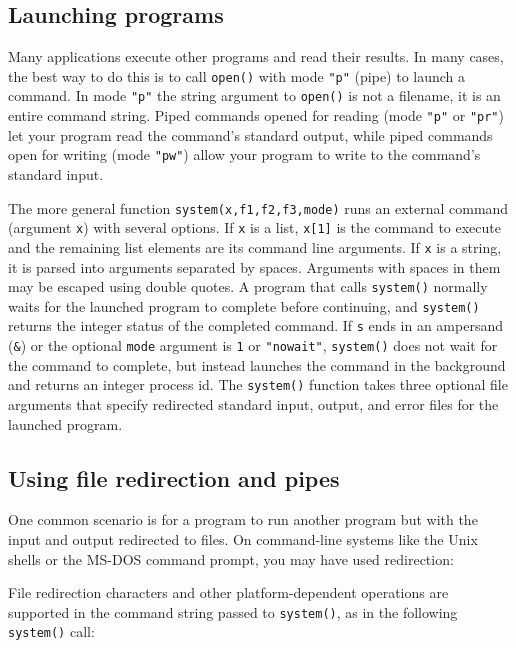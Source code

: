 \subsection{Launching programs}

Many applications execute other programs and read their results. In many cases,
the best way to do this is to call \texttt{open()} with mode \texttt{"p"}
(pipe) to launch a command. In mode \texttt{"p"} the string argument
to \texttt{open()} is not a filename, it is an entire command string. Piped
commands opened for reading (mode \texttt{"p"} or \texttt{"pr"}) let your
program read the command's standard output, while piped commands open for
writing (mode \texttt{"pw"}) allow your program to write to the command's
standard input.

The more general function \texttt{system(x,f1,f2,f3,mode)} runs an external
command (argument \texttt{x}) with several options. If \texttt{x} is a list,
\texttt{x[1]} is the command to execute and the remaining list elements are its
command line arguments. If \texttt{x} is a string, it is parsed into arguments
separated by spaces. Arguments with spaces in them may be escaped using double
quotes. A program that calls \texttt{system()} normally waits
for the launched program to complete before continuing, and \texttt{system()}
returns the integer status of the completed command. If \texttt{s} ends in an
ampersand (\texttt{\&}) or the optional \texttt{mode} argument is \texttt{1} or
\texttt{"nowait"}, \texttt{system()} does not wait for the command to complete,
but instead launches the command in the background and returns an integer
process id. The \texttt{system()} function takes three optional file arguments
that specify redirected standard input, output, and error files for the launched
program.

\subsection{Using file redirection and pipes}

One common scenario is for a program to run
another program but with the input and output redirected to files. On
command-line systems like the Unix shells or the MS-DOS command prompt,
you may have used redirection:


\noindent
File redirection characters and other platform-dependent operations are
supported in the command string passed to \texttt{system()}, as
in the following \texttt{system()} call:

